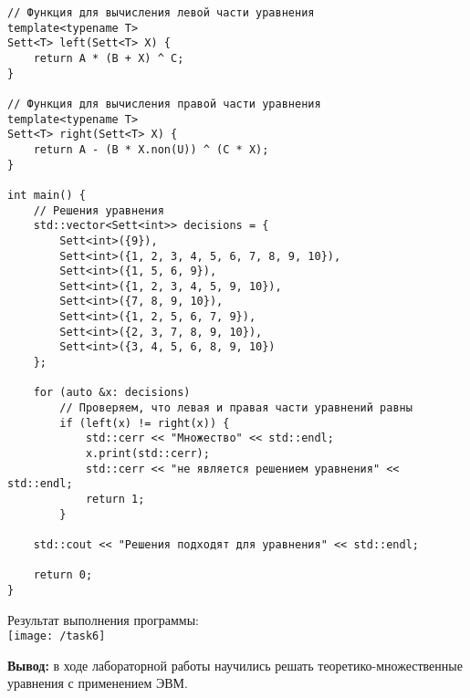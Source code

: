 \documentclass[a4paper,14pt]{extarticle}
\begin{document}
\begin{enumerate}[№1. ]
\begin{verbatim}
// Функция для вычисления левой части уравнения
template<typename T>
Sett<T> left(Sett<T> X) {
	return A * (B + X) ^ C;
}

// Функция для вычисления правой части уравнения
template<typename T>
Sett<T> right(Sett<T> X) {
	return A - (B * X.non(U)) ^ (C * X);
}

int main() {
	// Решения уравнения
	std::vector<Sett<int>> decisions = {
		Sett<int>({9}),
		Sett<int>({1, 2, 3, 4, 5, 6, 7, 8, 9, 10}),
		Sett<int>({1, 5, 6, 9}),
		Sett<int>({1, 2, 3, 4, 5, 9, 10}),
		Sett<int>({7, 8, 9, 10}),
		Sett<int>({1, 2, 5, 6, 7, 9}),
		Sett<int>({2, 3, 7, 8, 9, 10}),
		Sett<int>({3, 4, 5, 6, 8, 9, 10})
	};
	
	for (auto &x: decisions) 
		// Проверяем, что левая и правая части уравнений равны
		if (left(x) != right(x)) {
			std::cerr << "Множество" << std::endl;
			x.print(std::cerr);
			std::cerr << "не является решением уравнения" << std::endl;
			return 1;
		}
	
	std::cout << "Решения подходят для уравнения" << std::endl;
	
	return 0;
}
\end{verbatim}
Результат выполнения программы:\\
\texttt{[image: /task6]}\\
\end{enumerate}
			\textbf{Вывод: } в ходе лабораторной работы научились решать теоретико-множественные уравнения с применением ЭВМ.
\end{document}
